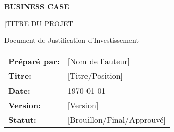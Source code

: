 










\begin{titlepage}
\dollaramalogo[0.6]

\vspace{2cm}

\begin{center}
{\Huge\bfseries\color{DollaramaGreen} BUSINESS CASE}

\vspace{1cm}

{\Large\color{DollaramaGreen} [TITRE DU PROJET]}

\vspace{2cm}

{\large Document de Justification d'Investissement}

\vspace{3cm}

\begin{tabular}{ll}
\textbf{Préparé par:} & [Nom de l'auteur] \\
\textbf{Titre:} & [Titre/Position] \\
\textbf{Date:} & \today \\
\textbf{Version:} & [Version] \\
\textbf{Statut:} & [Brouillon/Final/Approuvé]
\end{tabular}

\vfill

\dollaramalogo[0.4]
\end{center}
\end{titlepage}

\setcounter{page}{1}

\tableofcontents
\clearpage

\listoftables
\clearpage

\listoffigures
\clearpage



